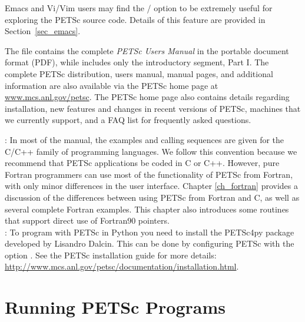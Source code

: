 Emacs and Vi/Vim users may find the
/  option to be extremely useful for exploring the PETSc
source code.  Details of this feature are provided in
Section~\ref{sec_emacs}.

The file  contains
the complete {\em PETSc Users Manual} in the portable document format (PDF),
while 
includes only the introductory segment, Part I.  
The complete PETSc distribution, users
manual, manual pages, and additional information are also available via
the PETSc home page at
\href{http://www.mcs.anl.gov/petsc}{www.mcs.anl.gov/petsc}.
The PETSc home page also
contains details regarding installation, new features and changes in recent
versions of PETSc, machines that we currently support, and a FAQ list for frequently asked questions.

\medskip\medskip

: In most of the
manual, the examples and calling sequences are given for the C/C++
family of programming languages.  We follow this convention because we
recommend that PETSc applications be coded in C or C++.
However, pure Fortran programmers can use most of the
functionality of PETSc from Fortran, with only minor differences in
the user interface.  Chapter \ref{ch_fortran} provides a discussion of the
differences between using PETSc from Fortran and C, as well as several
complete Fortran examples.  This chapter also introduces some
routines that support direct use of Fortran90 pointers. \\

: To program with PETSc in Python you need to install the PETSc4py package developed by
Lisandro Dalcin. This can be done by configuring PETSc with the option . See the PETSc installation guide
for more details:\\ \href{http://www.mcs.anl.gov/petsc/documentation/installation.html}{http://www.mcs.anl.gov/petsc/documentation/installation.html}.

\section{Running PETSc Programs}
\label{sec_running}

